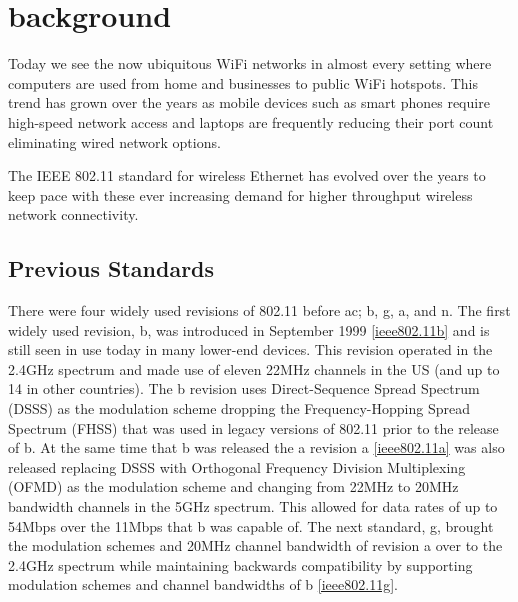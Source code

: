 \section{background}

Today we see the now ubiquitous WiFi networks in almost every setting where computers are used from home and businesses to public WiFi hotspots. This trend has grown over the years as mobile devices such as smart phones require high-speed network access and laptops are frequently reducing their port count eliminating wired network options.

The IEEE 802.11 standard for wireless Ethernet has evolved over the years to keep pace with these ever increasing demand for higher throughput wireless network connectivity.

\subsection{Previous Standards}

There were four widely used revisions of 802.11 before ac; b, g, a, and n. The first widely used revision, b, was introduced in September 1999 \ref{ieee802.11b} and is still seen in use today in many lower-end devices. This revision operated in the 2.4GHz spectrum and made use of eleven 22MHz channels in the US (and up to 14 in other countries). The b revision uses Direct-Sequence Spread Spectrum (DSSS) as the modulation scheme dropping the Frequency-Hopping Spread Spectrum (FHSS) that was used in legacy versions of 802.11 prior to the release of b. At the same time that b was released the a revision a \ref{ieee802.11a} was also released replacing DSSS with Orthogonal Frequency Division Multiplexing (OFMD) as the modulation scheme and changing from 22MHz to 20MHz bandwidth channels in the 5GHz spectrum. This allowed for data rates of up to 54Mbps over the 11Mbps that b was capable of. The next standard, g, brought the modulation schemes and 20MHz channel bandwidth of revision a over to the 2.4GHz spectrum while maintaining backwards compatibility by supporting modulation schemes and channel bandwidths of b \ref{ieee802.11g}. 


